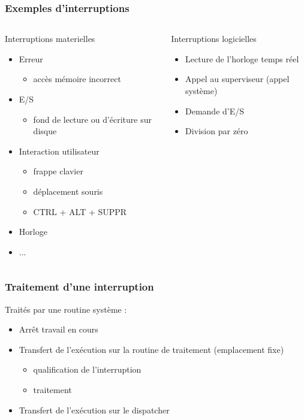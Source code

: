 \begin{frame}
\frametitle{Exemples d'interruptions}
\begin{columns}
\begin{exampleblock}{Interruptions materielles}
\begin{itemize}
\item Erreur
\begin{itemize}
\item accès mémoire incorrect
\end{itemize}
\item E/S
\begin{itemize}
\item fond de lecture ou d'écriture sur disque
\end{itemize}

\item Interaction utilisateur
\begin{itemize}
\item frappe clavier
\item déplacement souris
\item CTRL + ALT + SUPPR
\end{itemize}
\item Horloge
\item ...
\end{itemize}

\end{exampleblock}
\begin{exampleblock}{Interruptions logicielles}
\begin{itemize}
\item Lecture de l'horloge temps réel
\item Appel au superviseur (appel système)
\item Demande d'E/S
\item Division par zéro
\end{itemize}

\end{exampleblock}
\end{columns}
\end{frame}

\begin{frame}
 \frametitle{Traitement d’une interruption}
 Traités par une routine système :
\begin{itemize}
\item Arrêt travail en cours
\item Transfert de l’exécution sur la routine de traitement (emplacement fixe)
\begin{itemize}
\item qualification de l’interruption
\item traitement
\end{itemize}
\item Transfert de l’exécution sur le dispatcher
\end{itemize}
\end{frame}


